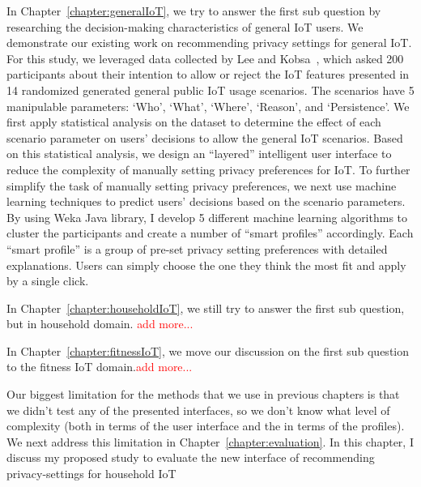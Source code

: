 In Chapter~\ref{chapter:generalIoT}, we try to answer the first sub question by researching the decision-making characteristics of general IoT users. We demonstrate our existing work on recommending privacy settings for general IoT. For this study, we leveraged data collected by Lee and Kobsa~\cite{lee2016understanding}, which asked 200 participants about their intention to allow or reject the IoT features presented in 14 randomized generated general public IoT usage scenarios. The scenarios have 5 manipulable parameters: `Who', `What', `Where', `Reason', and `Persistence'. We first apply statistical analysis on the dataset to determine the effect of each scenario parameter on users' decisions to allow the general IoT scenarios. Based on this statistical analysis, we design an ``layered'' intelligent user interface to reduce the complexity of manually setting privacy preferences for IoT. To further simplify the task of manually setting privacy preferences, we next use machine learning techniques to predict users' decisions based on the scenario parameters. By using Weka Java library, I develop 5 different machine learning algorithms to cluster the participants and create a number of ``smart profiles''  accordingly. Each ``smart profile'' is a group of pre-set privacy setting preferences with detailed explanations. Users can simply choose the one they think the most fit and apply by a single click.
	
In Chapter~\ref{chapter:householdIoT}, we still try to answer the first sub question, but in household domain. \textcolor{red}{add more...}
	
In Chapter~\ref{chapter:fitnessIoT}, we move our discussion on the first sub question to the fitness IoT domain.\textcolor{red}{add more...}
	
Our biggest limitation for the methods that we use in previous chapters is that we didn't test any of the presented interfaces, so we don't know what level of complexity (both in terms of the user interface and the in terms of the profiles). We next address this limitation in Chapter~\ref{chapter:evaluation}. In this chapter, I discuss my proposed study to evaluate the new interface of recommending privacy-settings for household IoT





